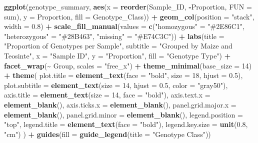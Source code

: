 \documentclass[
]{article}
\newenvironment{Shaded}{\begin{snugshade}}{\end{snugshade}}
\newcommand{\AttributeTok}[1]{\textcolor[rgb]{0.13,0.29,0.53}{#1}}
\newcommand{\DecValTok}[1]{\textcolor[rgb]{0.00,0.00,0.81}{#1}}
\newcommand{\FloatTok}[1]{\textcolor[rgb]{0.00,0.00,0.81}{#1}}
\newcommand{\FunctionTok}[1]{\textcolor[rgb]{0.13,0.29,0.53}{\textbf{#1}}}
\newcommand{\NormalTok}[1]{#1}
\newcommand{\OtherTok}[1]{\textcolor[rgb]{0.56,0.35,0.01}{#1}}
\newcommand{\SpecialCharTok}[1]{\textcolor[rgb]{0.81,0.36,0.00}{\textbf{#1}}}
\newcommand{\StringTok}[1]{\textcolor[rgb]{0.31,0.60,0.02}{#1}}
\begin{document}
\begin{Shaded}
\begin{Highlighting}[]
\FunctionTok{ggplot}\NormalTok{(genotype\_summary, }\FunctionTok{aes}\NormalTok{(}\AttributeTok{x =} \FunctionTok{reorder}\NormalTok{(Sample\_ID, }\SpecialCharTok{{-}}\NormalTok{Proportion, }\AttributeTok{FUN =}\NormalTok{ sum), }
                             \AttributeTok{y =}\NormalTok{ Proportion, }\AttributeTok{fill =}\NormalTok{ Genotype\_Class)) }\SpecialCharTok{+}
  \FunctionTok{geom\_col}\NormalTok{(}\AttributeTok{position =} \StringTok{"stack"}\NormalTok{, }\AttributeTok{width =} \FloatTok{0.8}\NormalTok{) }\SpecialCharTok{+}
  \FunctionTok{scale\_fill\_manual}\NormalTok{(}\AttributeTok{values =} \FunctionTok{c}\NormalTok{(}\StringTok{"homozygous"} \OtherTok{=} \StringTok{"\#2E86C1"}\NormalTok{, }
                               \StringTok{"heterozygous"} \OtherTok{=} \StringTok{"\#28B463"}\NormalTok{,  }
                               \StringTok{"missing"} \OtherTok{=} \StringTok{"\#E74C3C"}\NormalTok{)) }\SpecialCharTok{+}
  \FunctionTok{labs}\NormalTok{(}\AttributeTok{title =} \StringTok{"Proportion of Genotypes per Sample"}\NormalTok{,}
       \AttributeTok{subtitle =} \StringTok{"Grouped by Maize and Teosinte"}\NormalTok{,}
       \AttributeTok{x =} \StringTok{"Sample ID"}\NormalTok{, }\AttributeTok{y =} \StringTok{"Proportion"}\NormalTok{, }\AttributeTok{fill =} \StringTok{"Genotype Type"}\NormalTok{) }\SpecialCharTok{+}
  \FunctionTok{facet\_wrap}\NormalTok{(}\SpecialCharTok{\textasciitilde{}}\NormalTok{ Group, }\AttributeTok{scales =} \StringTok{"free\_x"}\NormalTok{) }\SpecialCharTok{+}
  \FunctionTok{theme\_minimal}\NormalTok{(}\AttributeTok{base\_size =} \DecValTok{14}\NormalTok{) }\SpecialCharTok{+}
  \FunctionTok{theme}\NormalTok{(}
    \AttributeTok{plot.title =} \FunctionTok{element\_text}\NormalTok{(}\AttributeTok{face =} \StringTok{"bold"}\NormalTok{, }\AttributeTok{size =} \DecValTok{18}\NormalTok{, }\AttributeTok{hjust =} \FloatTok{0.5}\NormalTok{),  }
    \AttributeTok{plot.subtitle =} \FunctionTok{element\_text}\NormalTok{(}\AttributeTok{size =} \DecValTok{14}\NormalTok{, }\AttributeTok{hjust =} \FloatTok{0.5}\NormalTok{, }\AttributeTok{color =} \StringTok{"gray50"}\NormalTok{),  }
    \AttributeTok{axis.title =} \FunctionTok{element\_text}\NormalTok{(}\AttributeTok{size =} \DecValTok{14}\NormalTok{, }\AttributeTok{face =} \StringTok{"bold"}\NormalTok{),  }
    \AttributeTok{axis.text.x =} \FunctionTok{element\_blank}\NormalTok{(),  }
    \AttributeTok{axis.ticks.x =} \FunctionTok{element\_blank}\NormalTok{(),  }
    \AttributeTok{panel.grid.major.x =} \FunctionTok{element\_blank}\NormalTok{(),  }
    \AttributeTok{panel.grid.minor =} \FunctionTok{element\_blank}\NormalTok{(),  }
    \AttributeTok{legend.position =} \StringTok{"top"}\NormalTok{,  }
    \AttributeTok{legend.title =} \FunctionTok{element\_text}\NormalTok{(}\AttributeTok{face =} \StringTok{"bold"}\NormalTok{),  }
    \AttributeTok{legend.key.size =} \FunctionTok{unit}\NormalTok{(}\FloatTok{0.8}\NormalTok{, }\StringTok{"cm"}\NormalTok{)  }
\NormalTok{  ) }\SpecialCharTok{+}
  \FunctionTok{guides}\NormalTok{(}\AttributeTok{fill =} \FunctionTok{guide\_legend}\NormalTok{(}\AttributeTok{title =} \StringTok{"Genotype Class"}\NormalTok{))}
\end{Highlighting}
\end{Shaded}
\end{document}

